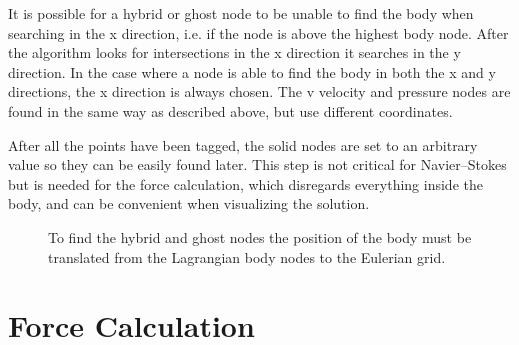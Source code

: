 It is possible for a hybrid or ghost node to be unable to find the body when searching in the x direction, i.e. if the node is above the highest body node.
After the algorithm looks for intersections in the x direction it searches in the y direction.
In the case where a node is able to find the body in both the x and y directions, the x direction is always chosen. 
The v velocity and pressure nodes are found in the same way as described above, but use different coordinates.

After all the points have been tagged, the solid nodes are set to an arbitrary value so they can be easily found later.
This step is not critical for Navier--Stokes but is needed for the force calculation, which disregards everything inside the body, and can be convenient when visualizing the solution.
\begin{figure}
	\centering
	
	\caption{To find the hybrid and ghost nodes the position of the body must be translated from the Lagrangian body nodes to the Eulerian grid.}
	\label{fig:node id 1}
\end{figure}

\section{Force Calculation}
\label{Force Calculation}

